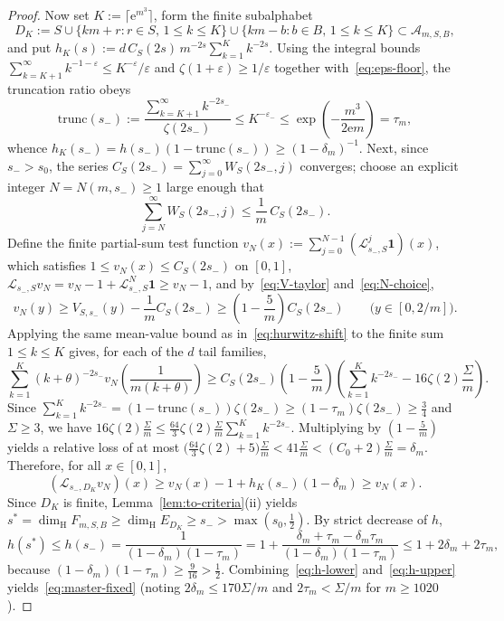 \documentclass[11pt]{article}
\theoremstyle{definition}
\theoremstyle{remark}
\newcommand{\ee}{\mathrm{e}}
\newcommand{\dimH}{\dim_{\mathrm{H}}}
\begin{document}
\begin{proof}
Now set $K:=\lceil\ee^{m^3}\rceil$, form the finite subalphabet
\[
D_K:=S\cup\{km+r:r\in S,\,1\le k\le K\}\cup\{km-b:b\in B,\,1\le k\le K\}
\subset\mathcal A_{m,S,B},
\]
and put $h_K(s):=d\,C_S(2s)\,m^{-2s}\sum_{k=1}^K k^{-2s}$. Using the integral
bounds $\sum_{k=K+1}^\infty k^{-1-\varepsilon}\le K^{-\varepsilon}/\varepsilon$
and $\zeta(1+\varepsilon)\ge 1/\varepsilon$ together with~\eqref{eq:eps-floor},
the truncation ratio obeys
\[
\mathrm{trunc}(s_-):=\frac{\sum_{k=K+1}^\infty k^{-2s_-}}{\zeta(2s_-)}
\le K^{-\varepsilon_-}
\le\exp\!\left(-\frac{m^3}{2\ee m}\right)=\tau_m,
\]
whence $h_K(s_-)=h(s_-)(1-\mathrm{trunc}(s_-))\ge (1-\delta_m)^{-1}$. Next,
since $s_->s_0$, the series $C_S(2s_-)=\sum_{j=0}^\infty W_S(2s_-,j)$
converges; choose an explicit integer $N=N(m,s_-)\ge1$ large enough that
\begin{equation}\label{eq:N-choice}
\sum_{j=N}^\infty W_S(2s_-,j)\le\frac{1}{m}\,C_S(2s_-).
\end{equation}
Define the finite partial-sum test function
$v_N(x):=\sum_{j=0}^{N-1}(\mathcal L_{s_-,S}^j\mathbf 1)(x)$, which satisfies
$1\le v_N(x)\le C_S(2s_-)$ on $[0,1]$,
$\mathcal L_{s_-,S}v_N=v_N-1+\mathcal L_{s_-,S}^N\mathbf 1\ge v_N-1$, and by~\eqref{eq:V-taylor}
and~\eqref{eq:N-choice},
\[
v_N(y)\ge V_{S,s_-}(y)-\frac{1}{m}C_S(2s_-)\ge\left(1-\frac{5}{m}\right)C_S(2s_-)
\qquad\bigl(y\in[0,2/m]\bigr).
\]
Applying the same mean-value bound as in~\eqref{eq:hurwitz-shift} to the
finite sum $1\le k\le K$ gives, for each of the $d$ tail families,
\[
\sum_{k=1}^K(k+\theta)^{-2s_-}v_N\!\left(\frac{1}{m(k+\theta)}\right)
\ge C_S(2s_-)\left(1-\frac{5}{m}\right)\left(\sum_{k=1}^K k^{-2s_-}-16\zeta(2)\frac{\Sigma}{m}\right).
\]
Since $\sum_{k=1}^K k^{-2s_-}=(1-\mathrm{trunc}(s_-))\zeta(2s_-)\ge(1-\tau_m)\zeta(2s_-)\ge\frac34$
and $\Sigma\ge 3$, we have
$16\zeta(2)\frac{\Sigma}{m}\le\frac{64}{3}\zeta(2)\frac{\Sigma}{m}\sum_{k=1}^K k^{-2s_-}$.
Multiplying by $(1-\frac{5}{m})$ yields a relative loss of at most
$\bigl(\frac{64}{3}\zeta(2)+5\bigr)\frac{\Sigma}{m}<41\frac{\Sigma}{m}<(C_0+2)\frac{\Sigma}{m}=\delta_m$.
Therefore, for all $x\in[0,1]$,
\[
(\mathcal L_{s_-,D_K}v_N)(x)\ge v_N(x)-1+h_K(s_-)(1-\delta_m)\ge v_N(x).
\]
Since $D_K$ is finite, Lemma~\ref{lem:to-criteria}(ii) yields
$s^*=\dimH F_{m,S,B}\ge\dimH E_{D_K}\ge s_->\max(s_0,\frac12)$. By strict
decrease of $h$,
\begin{equation}\label{eq:h-upper}
h(s^*)\le h(s_-)=\frac{1}{(1-\delta_m)(1-\tau_m)}
=1+\frac{\delta_m+\tau_m-\delta_m\tau_m}{(1-\delta_m)(1-\tau_m)}
\le 1+2\delta_m+2\tau_m,
\end{equation}
because $(1-\delta_m)(1-\tau_m)\ge\frac{9}{16}>\frac12$. Combining~\eqref{eq:h-lower}
and~\eqref{eq:h-upper} yields~\eqref{eq:master-fixed} (noting $2\delta_m\le 170\Sigma/m$
and $2\tau_m<\Sigma/m$ for $m\ge1020$).
\end{proof}
\end{document}
